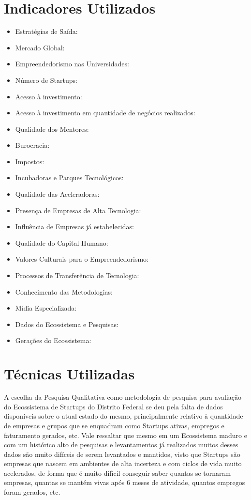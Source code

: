 \section{Indicadores Utilizados}
\label{section:indicadores_utilizados}

\begin{itemize}
  \item Estratégias de Saída:
  \item Mercado Global:
  \item Empreendedorismo nas Universidades:
  \item Número de Startups:
  \item Acesso à investimento:
  \item Acesso à investimento em quantidade de negócios realizados:
  \item Qualidade dos Mentores:
  \item Burocracia:
  \item Impostos:
  \item Incubadoras e Parques Tecnológicos:
  \item Qualidade das Aceleradoras:
  \item Presença de Empresas de Alta Tecnologia:
  \item Influência de Empresas já estabelecidas:
  \item Qualidade do Capital Humano:
  \item Valores Culturais para o Empreendedorismo:
  \item Processos de Transferência de Tecnologia:
  \item Conhecimento das Metodologias:
  \item Mídia Especializada:
  \item Dados do Ecossistema e Pesquisas:
  \item Gerações do Ecossistema:
\end{itemize}

\section{Técnicas Utilizadas}
\label{section:tecnicas_utilizadas}

A escolha da Pesquisa Qualitativa como metodologia de pesquisa para avaliação do Ecossistema de Startups do Distrito Federal se deu pela falta de dados disponíveis sobre o atual estado do mesmo,
principalmente relativo à quantidade de empresas e grupos que se enquadram como Startups ativas, empregos e faturamento gerados, etc. Vale ressaltar que mesmo em um Ecossistema maduro e com um histórico
alto de pesquisas e levantamentos já realizados muitos desses dados são muito difíceis de serem levantados e mantidos, visto que Startups são empresas que nascem em ambientes de alta incerteza e
com ciclos de vida muito acelerados, de forma que é muito difícil conseguir saber quantas se tornaram empresas, quantas se mantém vivas após 6 meses de atividade, quantos empregos foram gerados, etc.

